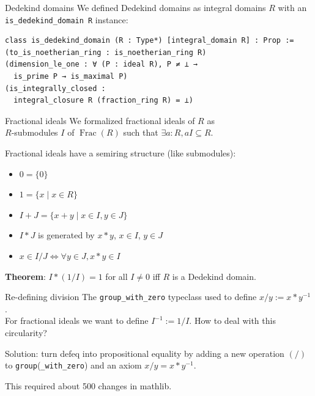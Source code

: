 \documentclass{beamer}
\newcommand{\lean}[1]{\texttt{#1}\xspace}
\newcommand{\mathlib}{\textsf{mathlib}\xspace}
\DeclareMathOperator{\Frac}{Frac}
\begin{document}
\begin{frame}[fragile]{Dedekind domains}
	We defined Dedekind domains as integral domains $R$ with an \lean{is\_dedekind\_domain R} instance:
\begin{lstlisting}
class is_dedekind_domain (R : Type*) [integral_domain R] : Prop :=
(to_is_noetherian_ring : is_noetherian_ring R)
(dimension_le_one : ∀ (P : ideal R), P ≠ ⊥ →
  is_prime P → is_maximal P)
(is_integrally_closed :
  integral_closure R (fraction_ring R) = ⊥)
\end{lstlisting}

\end{frame}

\begin{frame}{Fractional ideals}
	We formalized fractional ideals of $R$ as\\
	$R$-submodules $I$ of $\Frac(R)$ such that $\exists a : R, a I \subseteq R$.

	Fractional ideals have a semiring structure (like submodules):\\
	\begin{itemize}
		\item $0 = \{0\}$
		\item $1 = \{x \mid x \in R\}$
		\item $I + J = \{x + y \mid x \in I, y \in J\}$
		\item $I * J$ is generated by $x * y$, $x \in I$, $y \in J$
		\item $x \in I / J \iff \forall y \in J, x * y \in I$
	\end{itemize}

\pause
	\textbf{Theorem}: $I * (1 / I) = 1$ for all $I \ne 0$ iff $R$ is a Dedekind domain.
\end{frame}

\begin{frame}{Re-defining division}
	The \lean{group\_with\_zero} typeclass used to define $x / y := x * y^{-1}$.\\
	For fractional ideals we want to define $I^{-1} := 1 / I$.
	How to deal with this circularity?

	\pause
	Solution: turn defeq into propositional equality by
	adding a new operation $(/)$ to \lean{group}(\lean{\_with\_zero})
	and an axiom $x / y = x * y^{-1}$.

	This required about 500 changes in \mathlib.
\end{frame}
\end{document}
